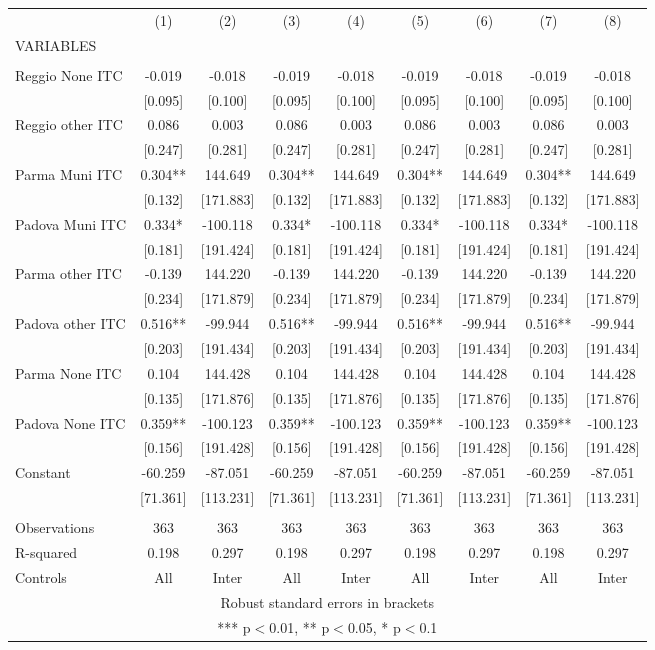 \begin{tabular}{lcccccccc} \hline
 & (1) & (2) & (3) & (4) & (5) & (6) & (7) & (8) \\
VARIABLES &  &  &  &  &  &  &  &  \\ \hline
 &  &  &  &  &  &  &  &  \\
Reggio None ITC & -0.019 & -0.018 & -0.019 & -0.018 & -0.019 & -0.018 & -0.019 & -0.018 \\
 & [0.095] & [0.100] & [0.095] & [0.100] & [0.095] & [0.100] & [0.095] & [0.100] \\
Reggio other ITC & 0.086 & 0.003 & 0.086 & 0.003 & 0.086 & 0.003 & 0.086 & 0.003 \\
 & [0.247] & [0.281] & [0.247] & [0.281] & [0.247] & [0.281] & [0.247] & [0.281] \\
Parma Muni ITC & 0.304** & 144.649 & 0.304** & 144.649 & 0.304** & 144.649 & 0.304** & 144.649 \\
 & [0.132] & [171.883] & [0.132] & [171.883] & [0.132] & [171.883] & [0.132] & [171.883] \\
Padova Muni ITC & 0.334* & -100.118 & 0.334* & -100.118 & 0.334* & -100.118 & 0.334* & -100.118 \\
 & [0.181] & [191.424] & [0.181] & [191.424] & [0.181] & [191.424] & [0.181] & [191.424] \\
Parma other ITC & -0.139 & 144.220 & -0.139 & 144.220 & -0.139 & 144.220 & -0.139 & 144.220 \\
 & [0.234] & [171.879] & [0.234] & [171.879] & [0.234] & [171.879] & [0.234] & [171.879] \\
Padova other ITC & 0.516** & -99.944 & 0.516** & -99.944 & 0.516** & -99.944 & 0.516** & -99.944 \\
 & [0.203] & [191.434] & [0.203] & [191.434] & [0.203] & [191.434] & [0.203] & [191.434] \\
Parma None ITC & 0.104 & 144.428 & 0.104 & 144.428 & 0.104 & 144.428 & 0.104 & 144.428 \\
 & [0.135] & [171.876] & [0.135] & [171.876] & [0.135] & [171.876] & [0.135] & [171.876] \\
Padova None ITC & 0.359** & -100.123 & 0.359** & -100.123 & 0.359** & -100.123 & 0.359** & -100.123 \\
 & [0.156] & [191.428] & [0.156] & [191.428] & [0.156] & [191.428] & [0.156] & [191.428] \\
Constant & -60.259 & -87.051 & -60.259 & -87.051 & -60.259 & -87.051 & -60.259 & -87.051 \\
 & [71.361] & [113.231] & [71.361] & [113.231] & [71.361] & [113.231] & [71.361] & [113.231] \\
 &  &  &  &  &  &  &  &  \\
Observations & 363 & 363 & 363 & 363 & 363 & 363 & 363 & 363 \\
R-squared & 0.198 & 0.297 & 0.198 & 0.297 & 0.198 & 0.297 & 0.198 & 0.297 \\
 Controls & All & Inter & All & Inter & All & Inter & All & Inter \\ \hline
\multicolumn{9}{c}{ Robust standard errors in brackets} \\
\multicolumn{9}{c}{ *** p$<$0.01, ** p$<$0.05, * p$<$0.1} \\
\end{tabular}

